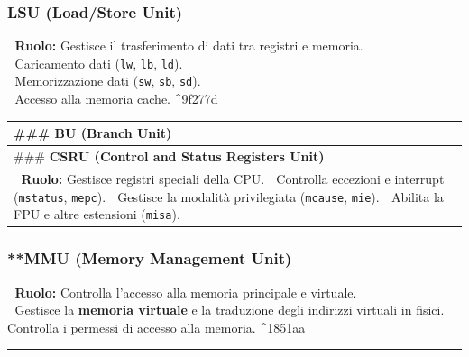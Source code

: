 \documentclass[
]{article}
\begin{document}
\subsubsection{\texorpdfstring{\textbf{LSU (Load/Store
Unit)}}{LSU (Load/Store Unit)}}\label{lsu-loadstore-unit}

📌 \textbf{Ruolo:} Gestisce il trasferimento di dati tra registri e
memoria.\\
🔹 Caricamento dati (\texttt{lw}, \texttt{lb}, \texttt{ld}).\\
🔹 Memorizzazione dati (\texttt{sw}, \texttt{sb}, \texttt{sd}).\\
🔹 Accesso alla memoria cache. \^{}9f277d

\begin{longtable}[]{@{}
  >{\raggedright\arraybackslash}p{}@{}}
\toprule\noalign{}
\begin{minipage}[b]{\linewidth}\raggedright
\#\#\# \textbf{BU (Branch Unit)}
\end{minipage} \\
\midrule\noalign{}
\endhead
\bottomrule\noalign{}
\endlastfoot
\#\#\# \textbf{CSRU (Control and Status Registers Unit)} \\
📌 \textbf{Ruolo:} Gestisce registri speciali della CPU. 🔹 Controlla
eccezioni e interrupt (\texttt{mstatus}, \texttt{mepc}). 🔹 Gestisce la
modalità privilegiata (\texttt{mcause}, \texttt{mie}). 🔹 Abilita la FPU
e altre estensioni (\texttt{misa}). \\
\end{longtable}

\subsubsection{**MMU (Memory Management
Unit)}\label{mmu-memory-management-unit}

📌 \textbf{Ruolo:} Controlla l'accesso alla memoria principale e
virtuale.\\
🔹 Gestisce la \textbf{memoria virtuale} e la traduzione degli indirizzi
virtuali in fisici. 🔹 Controlla i permessi di accesso alla memoria.
\^{}1851aa

\begin{center}\rule{0.5\linewidth}{0.5pt}\end{center}
\end{document}
